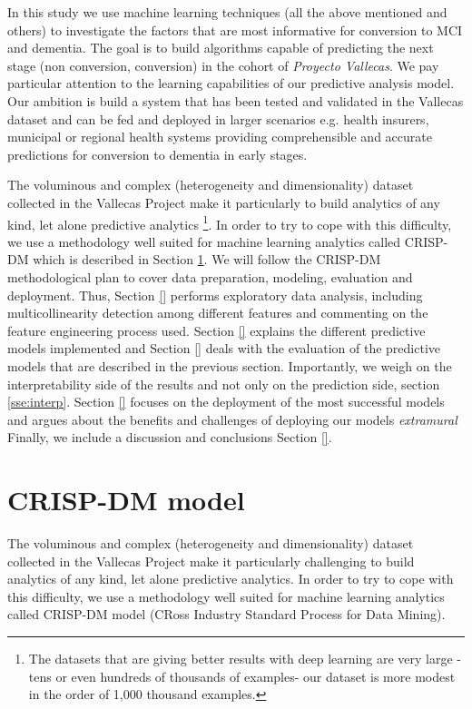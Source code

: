 \documentclass[11pt]{article}
\begin{document}
In this study we use machine learning techniques (all the above mentioned and others) to investigate the factors that are most informative for conversion to MCI and dementia. The goal is to build algorithms capable of predicting the next stage (non conversion, conversion) in the cohort of \emph{Proyecto Vallecas}. We pay particular attention to the learning capabilities of our predictive analysis model. Our ambition is build a system that has been tested and validated in the Vallecas dataset and can be fed and deployed in larger scenarios e.g. health insurers, municipal or regional health systems providing comprehensible and accurate predictions for conversion to dementia in early stages.

 The voluminous and complex (heterogeneity and dimensionality) dataset collected in the Vallecas Project make it particularly to build analytics of any kind, let alone predictive analytics \footnote{The datasets that are giving better results with deep learning are very large -tens or even hundreds of thousands of examples- our dataset is more modest in the order of 1,000 thousand examples.}. In order to try to cope with this difficulty, we use a methodology well suited for machine learning analytics called CRISP-DM which is described in Section \ref{se:crisp}. We will follow the CRISP-DM methodological plan to cover data preparation, modeling, evaluation and deployment. Thus, Section \ref{} performs exploratory data analysis, including multicollinearity detection among different features and commenting on the feature engineering process used. Section \ref{} explains the different predictive models implemented and Section \ref{} deals with the evaluation of the predictive models that are described in the previous section. Importantly, we weigh on the interpretability side of the results and not only on the prediction side, section \ref{sse:interp}.
 Section \ref{} focuses on the deployment of the most successful models and argues about the benefits and challenges of deploying our models \emph{extramural} Finally, we include a discussion and conclusions Section \ref{}.

\section{CRISP-DM model}
\label{se:crisp}
The voluminous and complex (heterogeneity and dimensionality) dataset collected in the Vallecas Project make it particularly challenging to build analytics of any kind, let alone predictive analytics.
In order to try to cope with this difficulty, we use a methodology well suited for machine learning analytics called CRISP-DM model (CRoss Industry Standard Process for Data Mining).
  
\end{document}

